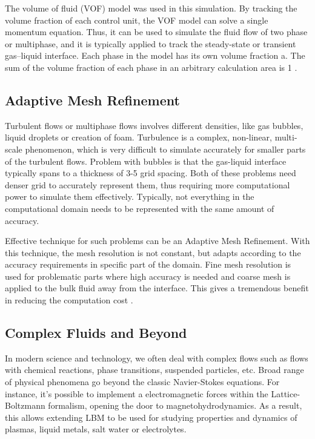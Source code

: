 The volume of fluid (VOF) model was used in this simulation. By tracking the volume fraction of each control unit, the VOF model can solve a single momentum equation. Thus, it can be used to simulate the fluid flow of two phase or multiphase, and it is typically applied to track the steady-state or transient gas–liquid interface.
Each phase in the model has its own volume fraction a. The sum of the volume fraction of each phase in an arbitrary calculation area is 1 \cite{lvSimulationFlowFluid}.
%

\subsection{Adaptive Mesh Refinement}

Turbulent flows or multiphase flows involves different densities, like gas bubbles, liquid droplets or creation of foam. Turbulence is a complex, non-linear, multi-scale phenomenon, which is very difficult to simulate accurately for smaller parts of the turbulent flows. Problem with bubbles is that the gas-liquid interface typically spans to a thickness of 3-5 grid spacing. Both of these problems need denser grid to accurately represent them, thus requiring more computational power to simulate them effectively. Typically, not everything in the computational domain needs to be represented with the same amount of accuracy.

Effective technique for such problems can be an Adaptive Mesh Refinement. With this technique, the mesh resolution is not constant, but adapts according to the accuracy requirements in specific part of the domain. Fine mesh resolution is used for problematic parts where high accuracy is needed and coarse mesh is applied to the bulk fluid away from the interface. This gives a tremendous benefit in reducing the computation cost \citep{yuanAdaptiveMeshRefinementmultiphase2017}.

\subsection{Complex Fluids and Beyond}

In modern science and technology, we often deal with complex flows such as flows with chemical reactions, phase transitions, suspended particles, etc. Broad range of physical phenomena go beyond the classic Navier-Stokes equations. For instance, it's possible to implement a electromagnetic forces within the Lattice-Boltzmann formalism, opening the door to magnetohydrodynamics. As a result, this allows extending LBM to be used for studying properties and dynamics of plasmas, liquid metals, salt water or electrolytes.

